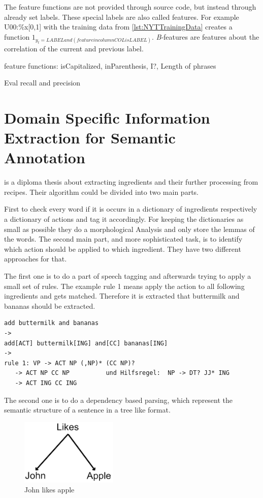 \documentclass[12pt, twoside]{report}
\begin{document}
The feature functions are not provided through source code, but instead through already set labels. These special labels are also called features. For example U00:\%x[0,1] with the training data from \cref{lst:NYTTrainingData} creates a function $1_{y_t=LABEL and (feature in column COL is LABEL)}$. \textit{B}-features are features about the correlation of the current and previous label. 

feature functions: isCapitalized, inParenthesis, I?, Length of phrases

Eval recall and precision
 
\section{Domain Specific Information Extraction for Semantic Annotation}
\parencite{GrammaBased} is a diploma thesis about extracting ingredients and their further processing from recipes. Their algorithm could be divided into two main parts.

First to check every word if it is occurs in a dictionary of ingredients respectively a dictionary of actions and tag it accordingly. For keeping the dictionaries as small as possible they do a morphological Analysis and only store the lemmas of the words. The second main part, and more sophisticated task, is to identify which action should be applied to which ingredient. They have two different approaches for that.

The first one is to do a part of speech tagging and afterwards trying to apply a small set of rules. The example rule 1 means apply the action to all following ingredients and gets matched. Therefore it is extracted that buttermilk and bananas should be extracted.

\begin{lstlisting}[frame=single, basicstyle=\footnotesize\ttfamily,caption={Rule based example}, label=lst:ruleBased]
add buttermilk and bananas
->
add[ACT] buttermilk[ING] and[CC] bananas[ING]
->
rule 1: VP -> ACT NP (,NP)* (CC NP)?
   -> ACT NP CC NP			und Hilfsregel:  NP -> DT? JJ* ING
   -> ACT ING CC ING

\end{lstlisting}

The second one is to do a dependency based parsing, which represent the semantic structure of a sentence in a tree like format.

\begin{figure}[h]
	\centering
	\includegraphics[]{Images/JohnLikesApple}
	\caption{John likes apple \parencite{GrammaBased}}
	\label{fig:johnLikesApple}
\end{figure}
\end{document}
